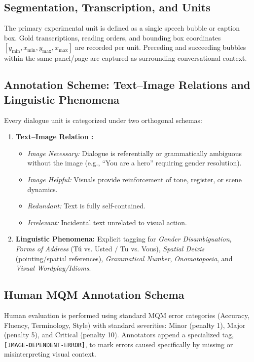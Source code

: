 \documentclass[11pt,a4paper]{article}
\begin{document}
\subsection{Segmentation, Transcription, and Units}
The primary experimental unit is defined as a single speech bubble or caption box. Gold transcriptions, reading orders, and bounding box coordinates $[y_{\min}, x_{\min}, y_{\max}, x_{\max}]$ are recorded per unit. Preceding and succeeding bubbles within the same panel/page are captured as surrounding conversational context.

\subsection{Annotation Scheme: Text--Image Relations and Linguistic Phenomena}
Every dialogue unit is categorized under two orthogonal schemas:
\begin{enumerate}[noitemsep]
    \item \textbf{Text--Image Relation \cite{martinec2005system}:}
    \begin{itemize}[noitemsep]
        \item \textit{Image Necessary:} Dialogue is referentially or grammatically ambiguous without the image (e.g., ``You are a hero'' requiring gender resolution).
        \item \textit{Image Helpful:} Visuals provide reinforcement of tone, register, or scene dynamics.
        \item \textit{Redundant:} Text is fully self-contained.
        \item \textit{Irrelevant:} Incidental text unrelated to visual action.
    \end{itemize}
    \item \textbf{Linguistic Phenomena:} Explicit tagging for \textit{Gender Disambiguation}, \textit{Forms of Address} (T\'u vs. Usted / Tu vs. Vous), \textit{Spatial Deixis} (pointing/spatial references), \textit{Grammatical Number}, \textit{Onomatopoeia}, and \textit{Visual Wordplay/Idioms}.
\end{enumerate}

\subsection{Human MQM Annotation Schema}
Human evaluation is performed using standard MQM error categories (Accuracy, Fluency, Terminology, Style) with standard severities: Minor (penalty 1), Major (penalty 5), and Critical (penalty 10). Annotators append a specialized tag, \texttt{[IMAGE-DEPENDENT-ERROR]}, to mark errors caused specifically by missing or misinterpreting visual context.
\end{document}
